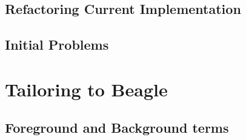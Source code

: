 \subsection{Refactoring Current Implementation}

\subsection{Initial Problems}

\section{Tailoring to Beagle}
\label{sec:tailored}

\subsection{Foreground and Background terms}

